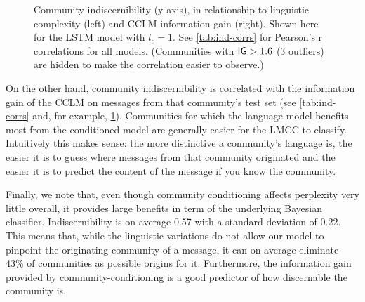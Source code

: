 \documentclass[11pt]{article}
\begin{document}
\begin{figure}
  \caption{%
    Community indiscernibility (y-axis), 
    in relationship to linguistic complexity (left) and 
    CCLM information gain (right). Shown here for the LSTM
    model with $l_c=1$. See \cref{tab:ind-corrs} for 
    Pearson's r correlations for all models.
    (Communities with \(\mathsf{IG} > 1.6\) (3 outliers) are hidden to make the correlation easier to observe.)
  }
  \label{fig:cclm-lmcc-ppl}
\end{figure}



On the other hand, community indiscernibility is correlated with
the information gain of the CCLM
on messages from that community's test set
(see \cref{tab:ind-corrs} and, for example, \cref{fig:cclm-lmcc-ppl}).
Communities for which the language model benefits most from 
the conditioned model are generally easier for the LMCC to classify.
Intuitively this makes sense:
the more distinctive a community's language is,
the easier it is to guess where messages from that community originated
and the easier it is to predict the content of the message if you know the community.

Finally, we note that, even though community conditioning affects
perplexity very little overall, it provides large benefits in term of
the underlying Bayesian classifier. Indiscernibility is on average
\num{0.57} with a standard deviation of \num{0.22}. This means
that, while the linguistic variations do not allow our model to
pinpoint the originating community of a message, it can on average
eliminate 43\% of communities as possible origins 
for it. Furthermore, the information gain provided by
community-conditioning is a good predictor of how discernable the
community is.
\end{document}
